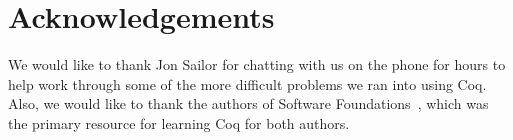 \documentclass[a4paper,twocolumn]{article}
\theoremstyle{plain}
\theoremstyle{definition}
\begin{document}
\section*{Acknowledgements}

We would like to thank Jon Sailor for chatting with us on the phone for hours to
help work through some of the more difficult problems we ran into using Coq.
Also, we would like to thank the authors of Software
Foundations~\cite{Pierce:sf}, which was the primary resource for learning Coq
for both authors.



\end{document}
